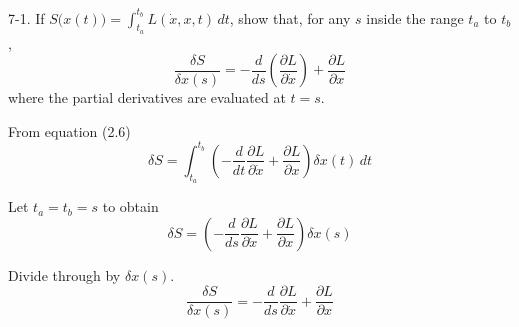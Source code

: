 \documentclass[12pt]{article}
\begin{document}
7-1.
If $S\big(x(t)\big)=\int_{t_a}^{t_b}L(\dot x,x,t)\,dt$, show that, for any
$s$ inside the range $t_a$ to $t_b$,
\begin{equation*}
\frac{\delta S}{\delta x(s)}=-\frac{d}{ds}\left(\frac{\partial L}{\partial\dot x}\right)
+\frac{\partial L}{\partial x}
\end{equation*}
where the partial derivatives are evaluated at $t=s$.

\bigskip
From equation (2.6)
\begin{equation*}
\delta S=\int_{t_a}^{t_b}\left(-\frac{d}{dt}\frac{\partial L}{\partial\dot x}
+\frac{\partial L}{\partial x}\right)\delta x(t)\,dt
\end{equation*}

Let $t_a=t_b=s$ to obtain
\begin{equation*}
\delta S=\left(-\frac{d}{ds}\frac{\partial L}{\partial\dot x}
+\frac{\partial L}{\partial x}\right)\delta x(s)
\end{equation*}

Divide through by $\delta x(s)$.
\begin{equation*}
\frac{\delta S}{\delta x(s)}=
-\frac{d}{ds}\frac{\partial L}{\partial\dot x}
+\frac{\partial L}{\partial x}
\end{equation*}
\end{document}
